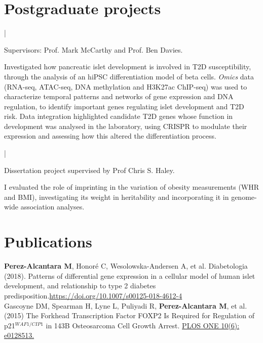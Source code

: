 \documentclass[letterpaper]{deedy-resume}
\begin{document}
	\begin{minipage}[t]{0.66\textwidth} 
		
		\section{Postgraduate projects}
		
		 |
		\vspace{\topsep} 
		\begin{tightitemize}
			\item Supervisors: Prof. Mark McCarthy and Prof. Ben Davies.\\
			\item Investigated how pancreatic islet development is involved in T2D susceptibility, through the analysis of an hiPSC differentiation model of beta cells. \textit{Omics} data (RNA-seq, ATAC-seq, DNA methylation and H3K27ac ChIP-seq) was used to characterize temporal patterns and networks of gene expression and DNA regulation, to identify important genes regulating islet development and T2D risk. Data integration highlighted candidate T2D genes whose function in development was analysed in the laboratory, using CRISPR to modulate their expression and assessing how this altered the differentiation process.
			
		\end{tightitemize}
		
		\sectionspace 
		
		 |
		\begin{tightitemize}
			\item Dissertation project supervised by Prof Chris S. Haley. \\
			\item I evaluated the role of imprinting in the variation of obesity measurements (WHR and BMI), investigating its weight in heritability and incorporating it in genome-wide association analyses.
		\end{tightitemize}
	
			\sectionspace 
	
	\section{Publications} 
	
	\textbullet{} \textbf{Perez-Alcantara M}, Honoré C, Wesolowska-Andersen A, et al. Diabetologia (2018). Patterns of differential gene expression in a cellular model of human islet development, and relationship to type 2 diabetes predisposition.\href{https://doi.org/10.1007/s00125-018-4612-4}{https://doi.org/10.1007/s00125-018-4612-4}\\
	\sectionspace
	\textbullet{} Gascoyne DM, Spearman H, Lyne L, Puliyadi R, \textbf{Perez-Alcantara M}, et al. (2015) The Forkhead Transcription Factor FOXP2 Is Required for Regulation of p21$^{WAF1/CIP1}$ in 143B Osteosarcoma Cell Growth Arrest. \href{https://doi.org/10.1371/journal.pone.0128513}{PLOS ONE 10(6): e0128513.}
		

\end{minipage}
\end{document}
